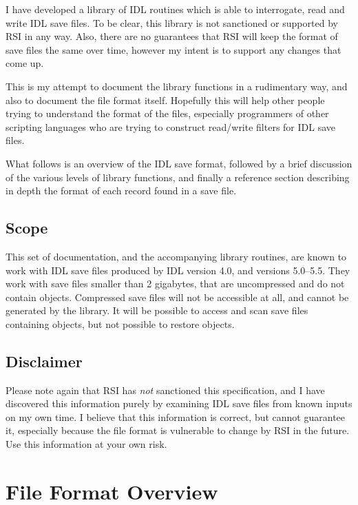 \documentclass[12pt]{article}
\begin{document}
I have developed a library of IDL routines which is able to
interrogate, read and write IDL save files.  To be clear, this library
is not sanctioned or supported by RSI in any way.  Also, there are no
guarantees that RSI will keep the format of save files the same over
time, however my intent is to support any changes that come up.

This is my attempt to document the library functions in a rudimentary
way, and also to document the file format itself.  Hopefully this will
help other people trying to understand the format of the files,
especially programmers of other scripting languages who are trying to
construct read/write filters for IDL save files.

What follows is an overview of the IDL save format, followed by a
brief discussion of the various levels of library functions, and
finally a reference section describing in depth the format of each
record found in a save file.

\subsection{Scope\label{s::scope}}

This set of documentation, and the accompanying library routines, are
known to work with IDL save files produced by IDL version 4.0, and
versions 5.0--5.5.  They work with save files smaller than 2
gigabytes, that are uncompressed and do not contain objects.
Compressed save files will not be accessible at all, and cannot be
generated by the library.  It will be possible to access and scan save
files containing objects, but not possible to restore objects.

\subsection{Disclaimer\label{s::disclaim}}

Please note again that RSI has {\it not\/} sanctioned this
specification, and I have discovered this information purely by
examining IDL save files from known inputs on my own time.  I believe
that this information is correct, but cannot guarantee it, especially
because the file format is vulnerable to change by RSI in the future.
Use this information at your own risk.

\section{File Format Overview\label{s:overview}}
\end{document}
